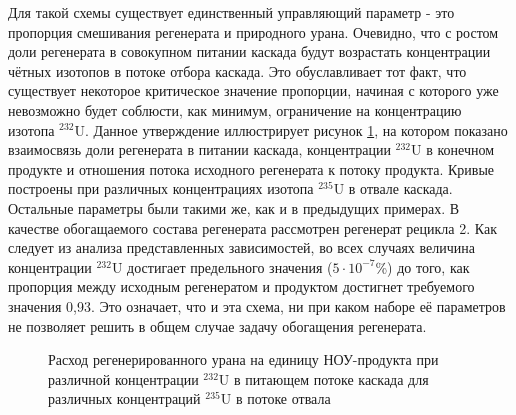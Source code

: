 Для такой схемы существует единственный управляющий параметр - это пропорция смешивания регенерата и природного урана. Очевидно, что с ростом доли регенерата в совокупном питании каскада будут возрастать концентрации чётных изотопов в потоке отбора каскада. Это обуславливает тот факт, что существует некоторое критическое значение пропорции, начиная с которого уже невозможно будет соблюсти, как минимум, ограничение на концентрацию изотопа $^{232}$U. Данное утверждение иллюстрирует рисунок \ref{sc3_1.second}, на котором показано взаимосвязь доли регенерата в питании каскада, концентрации $^{232}$U в конечном продукте и отношения потока исходного регенерата к потоку продукта. Кривые построены при различных концентрациях изотопа $^{235}$U в отвале каскада. Остальные параметры были такими же, как и в предыдущих примерах. В качестве обогащаемого состава регенерата рассмотрен регенерат рецикла 2. Как следует из анализа представленных зависимостей, во всех случаях величина концентрации  $^{232}$U достигает предельного значения ($5\cdot10^{-7}$\%) до того, как пропорция между исходным регенератом и продуктом достигнет требуемого значения 0,93. Это означает, что и эта схема, ни при каком наборе её параметров не позволяет решить в общем случае задачу обогащения регенерата. 

\begin{figure}[ht]
  \caption{Расход регенерированного урана на единицу НОУ-продукта  при различной концентрации $^{232}$U в питающем потоке каскада для различных концентраций $^{235}$U в потоке отвала}\label{sc3_1.second}
\end{figure}

